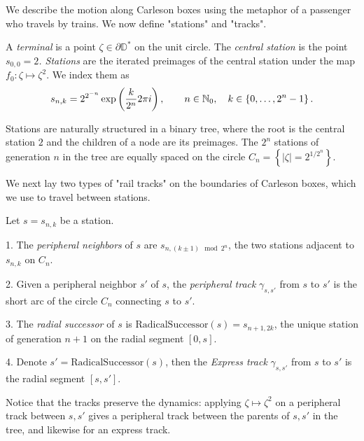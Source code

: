 We describe the motion along Carleson boxes using the metaphor of a passenger who travels by trains. 
We now define "stations" and "tracks".

\begin{definition}
A \emph{terminal} is a point $\zeta \in \partial \mathbb D^*$ on the unit circle.
The \emph{central station} is the point\emph{ $s_{0,0}=2$. Stations
}are the iterated preimages of the central station under the map $f_{0}:\zeta\mapsto \zeta^{2}$.
We index them as 
\[
s_{n,k}=2^{2^{-n}}\exp\left(\frac{k}{2^{n}}2\pi i\right),\qquad n\in\mathbb{N}_{0},\quad k\in\left\{ 0,\ldots,2^{n}-1\right\} .
\]

Stations are naturally structured in a binary tree, where the root
is the central station $2$ and the children of a node are its preimages.
The $2^{n}$ stations of generation $n$ in the tree are equally spaced
on the circle $C_{n}=\left\{ \left|\zeta\right|=2^{1/2^{n}}\right\} $. 


\end{definition}

We next lay two types of "rail tracks" on the boundaries of Carleson boxes, which we use to travel between stations.

\begin{definition}
Let $s=s_{n,k}$ be a station.

1. The \emph{peripheral neighbors} of $s$ are $s_{n,\left(k\pm1\right)\mod2^{n}}$,
the two stations adjacent to $s_{n,k}$ on $C_{n}$.

2. Given a peripheral neighbor $s'$ of $s$, the \emph{peripheral
	track }$\gamma_{s,s'}$ from $s$ to $s'$
is the short arc of the circle $C_{n}$ connecting $s$ to $s'$.

3. The \emph{radial successor} of $s$ is $\mathrm{RadicalSuccessor}(s)=s_{n+1,2k}$, the unique station of generation $n+1$ on the radial segment $[0,s]$.

4. Denote $s'=\mathrm{RadicalSuccessor}(s)$, then the \emph{Express track} $\gamma_{s,s'}$ from $s$ to $s'$ is the radial segment $[s,s']$.

\end{definition}

Notice that the tracks preserve the dynamics: applying $\zeta\mapsto \zeta^{2}$
on a peripheral track between $s,s'$ gives a peripheral track between the
parents of $s,s'$ in the tree, and likewise for an express track.

